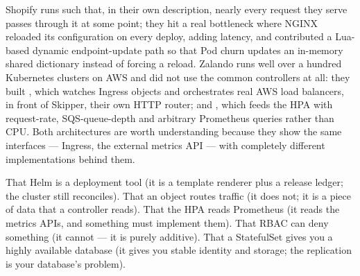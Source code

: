  Shopify runs  such that, in their own description, nearly every request they serve passes through it at some point; they hit a real bottleneck where NGINX reloaded its configuration on every deploy, adding latency, and contributed a Lua-based dynamic endpoint-update path so that Pod churn updates an in-memory shared dictionary instead of forcing a reload. Zalando runs well over a hundred Kubernetes clusters on AWS and did not use the common controllers at all: they built , which watches Ingress objects and orchestrates real AWS load balancers, in front of Skipper, their own HTTP router; and , which feeds the HPA with request-rate, SQS-queue-depth and arbitrary Prometheus queries rather than CPU. Both architectures are worth understanding because they show the same interfaces --- Ingress, the external metrics API --- with completely different implementations behind them.

 That Helm is a deployment tool (it is a template renderer plus a release ledger; the cluster still reconciles). That an  object routes traffic (it does not; it is a piece of data that a controller reads). That the HPA reads Prometheus (it reads the metrics APIs, and something must implement them). That RBAC can deny something (it cannot --- it is purely additive). That a StatefulSet gives you a highly available database (it gives you stable identity and storage; the replication is your database's problem).


